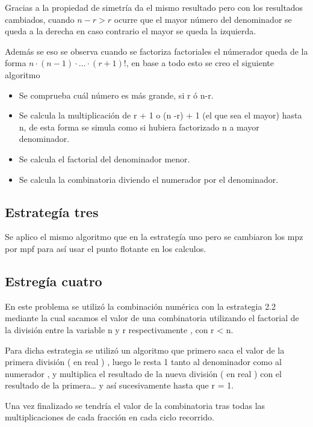\documentclass[12pt,letterpaper]{scrartcl}
\begin{document}
Gracias a la propiedad de simetría da el mismo resultado pero con los resultados cambiados, cuando $n-r > r$ ocurre que el mayor número del denominador se queda a la derecha en caso contrario el mayor se queda la izquierda.

Además se eso se observa cuando se factoriza factoriales el númerador queda de la forma $n \cdot (n-1) \cdot \ldots \cdot (r+1)!$, en base a todo esto se creo el siguiente algoritmo

\begin{itemize}
\item Se comprueba cuál número es más grande, si r ó n-r.


\item Se calcula la multiplicación de r + 1 o (n -r) + 1 (el que sea el mayor) hasta n, de esta forma se simula como si hubiera factorizado n a mayor denominador.

\item Se calcula el factorial del denominador menor.

\item Se calcula la combinatoria diviendo el numerador por el denominador.

\end{itemize}




\subsection{Estrategía tres}

Se aplico el mismo algoritmo que en la estrategía uno pero se cambiaron los mpz por mpf para así usar el punto flotante en los calculos.

\subsection{Estregía cuatro}


En este problema se utilizó la combinación numérica con la estrategia 2.2 mediante la cual sacamos el valor de una combinatoria utilizando el factorial de la división entre la variable n y r respectivamente , con r < n.

Para dicha estrategia se utilizó un algoritmo que primero saca el valor de la primera división ( en real ) , luego le resta 1 tanto al denominador como al numerador , y multiplica el resultado de la nueva división ( en real ) con el resultado de la primera… y así sucesivamente hasta que r = 1.

Una vez finalizado se tendría el valor de la combinatoria tras todas las multiplicaciones de cada fracción en cada ciclo recorrido.
\end{document}

